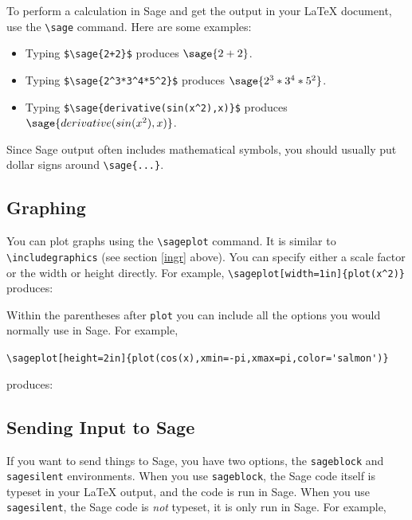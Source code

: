 \documentclass[12pt]{article}
\begin{document}
To perform a calculation in Sage and get the output in your \LaTeX{} document, use the \verb|\sage| command. Here are some examples:

\begin{itemize}

\item Typing \verb|$\sage{2+2}$| produces $\sage{2+2}$.

\item Typing \verb|$\sage{2^3*3^4*5^2}$| produces $\sage{2^3*3^4*5^2}$.

\item Typing \verb|$\sage{derivative(sin(x^2),x)}$| produces $\sage{derivative(sin(x^2),x)}$.

\end{itemize}

Since Sage output often includes mathematical symbols, you should usually put dollar signs around \verb|\sage{...}|.

\subsection{Graphing}

You can plot graphs using the \verb|\sageplot| command. It is similar to \verb|\includegraphics| (see section \ref{ingr} above). You can specify either a scale factor or the width or height directly. For example, \verb|\sageplot[width=1in]{plot(x^2)}| produces:


Within the parentheses after \verb|plot| you can include all the options you would normally use in Sage. For example,

\verb|\sageplot[height=2in]{plot(cos(x),xmin=-pi,xmax=pi,color='salmon')}|

produces:


\subsection{Sending Input to Sage}

If you want to send things to Sage, you have two options, the \verb|sageblock| and \verb|sagesilent| environments. When you use \verb|sageblock|, the Sage code itself is typeset in your \LaTeX{} output, and the code is run in Sage. When you use \verb|sagesilent|, the Sage code is \emph{not} typeset, it is only run in Sage. For example,
\end{document}
